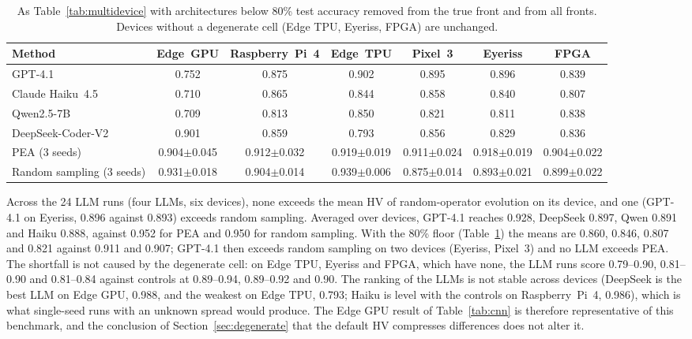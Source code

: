 \documentclass[11pt,a4paper]{article}
\begin{document}
\begin{table}[h]\centering\footnotesize
\caption{As Table~\ref{tab:multidevice} with architectures below 80\% test accuracy removed from the true front and from all fronts. Devices without a degenerate cell (Edge TPU, Eyeriss, FPGA) are unchanged.}\label{tab:multidevicefloor}
\setlength{\tabcolsep}{3pt}
\begin{tabular}{lcccccc}
\toprule
Method & Edge~GPU & Raspberry~Pi~4 & Edge~TPU & Pixel~3 & Eyeriss & FPGA \\
\midrule
GPT-4.1 & 0.752 & 0.875 & 0.902 & 0.895 & 0.896 & 0.839 \\
Claude Haiku~4.5 & 0.710 & 0.865 & 0.844 & 0.858 & 0.840 & 0.807 \\
Qwen2.5-7B & 0.709 & 0.813 & 0.850 & 0.821 & 0.811 & 0.838 \\
DeepSeek-Coder-V2 & 0.901 & 0.859 & 0.793 & 0.856 & 0.829 & 0.836 \\
PEA (3 seeds) & 0.904$\pm$0.045 & 0.912$\pm$0.032 & 0.919$\pm$0.019 & 0.911$\pm$0.024 & 0.918$\pm$0.019 & 0.904$\pm$0.022 \\
Random sampling (3 seeds) & 0.931$\pm$0.018 & 0.904$\pm$0.014 & 0.939$\pm$0.006 & 0.875$\pm$0.014 & 0.893$\pm$0.021 & 0.899$\pm$0.022 \\
\bottomrule
\end{tabular}
\end{table}

Across the 24 LLM runs (four LLMs, six devices), none exceeds the mean HV of random-operator evolution on its device, and one (GPT-4.1 on Eyeriss, 0.896 against 0.893) exceeds random sampling. Averaged over devices, GPT-4.1 reaches 0.928, DeepSeek 0.897, Qwen 0.891 and Haiku 0.888, against 0.952 for PEA and 0.950 for random sampling. With the 80\% floor (Table~\ref{tab:multidevicefloor}) the means are 0.860, 0.846, 0.807 and 0.821 against 0.911 and 0.907; GPT-4.1 then exceeds random sampling on two devices (Eyeriss, Pixel~3) and no LLM exceeds PEA. The shortfall is not caused by the degenerate cell: on Edge TPU, Eyeriss and FPGA, which have none, the LLM runs score 0.79--0.90, 0.81--0.90 and 0.81--0.84 against controls at 0.89--0.94, 0.89--0.92 and 0.90. The ranking of the LLMs is not stable across devices (DeepSeek is the best LLM on Edge GPU, 0.988, and the weakest on Edge TPU, 0.793; Haiku is level with the controls on Raspberry~Pi~4, 0.986), which is what single-seed runs with an unknown spread would produce. The Edge GPU result of Table~\ref{tab:cnn} is therefore representative of this benchmark, and the conclusion of Section~\ref{sec:degenerate} that the default HV compresses differences does not alter it.
\end{document}
